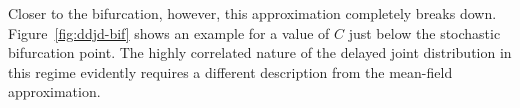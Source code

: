 \documentclass[english,letterpaper,12pt]{report}
\begin{document}
\begin{doublespacing}
Closer to the bifurcation, however, this approximation completely breaks down. Figure~\ref{fig:ddjd-bif} shows an example for a value of $C$ just below the stochastic bifurcation point. The highly correlated nature of the delayed joint distribution in this regime evidently requires a different description from the mean-field approximation.

\begin{figure}[tb]
\end{figure}
\end{doublespacing}
\end{document}
